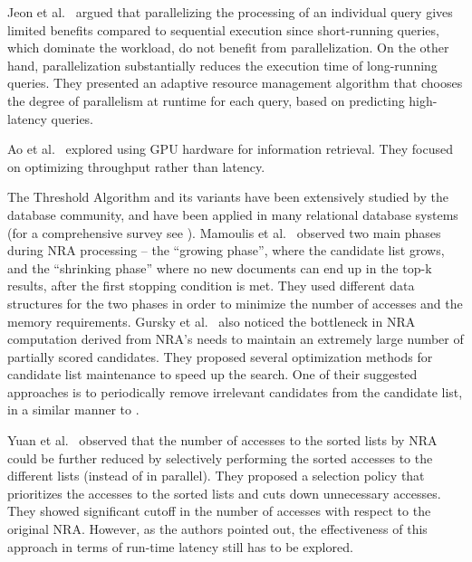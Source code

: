 Jeon et al.~\cite{Jeon:2014} argued that parallelizing the processing of an individual query gives limited benefits compared to sequential execution since short-running queries, which dominate the workload, do not benefit from parallelization. On the other hand, parallelization substantially reduces the execution time of long-running queries.  They presented an adaptive resource management algorithm that chooses the degree of parallelism at runtime for each query, based on predicting high-latency queries.

Ao et al.~\cite{Ao:2011} explored using GPU hardware for information retrieval. They focused on optimizing throughput rather than latency. 

The Threshold Algorithm and its variants \cite{Fagin:2001,Fagin:2003,Akbarinia:2007} have been extensively studied by the database community, and have been applied in many relational database systems (for a comprehensive survey see \cite{ilyas2008survey}). 
Mamoulis et al.~\cite{Mamoulis:2007} observed two main phases during NRA processing -- the ``growing phase'', where the candidate list grows, and the ``shrinking phase'' where no new documents can end up in the top-k results, after the first stopping condition is met. They used different data structures for the two phases in order to minimize the number of accesses and the memory requirements. 
Gursky et al.~\cite{Gursky:2008} also noticed the bottleneck in NRA computation derived from NRA's needs to maintain an extremely large number of partially scored candidates. They proposed several optimization methods for candidate list maintenance to speed up the search. One of their suggested approaches is to periodically remove irrelevant candidates from the candidate list, in a similar manner to \alg{}. 

Yuan et al.~\cite{yuan:2012} observed that the number of accesses to the sorted lists by NRA could be further reduced by selectively performing the sorted accesses to the different lists (instead of in parallel). They proposed a selection policy that prioritizes the accesses to the sorted lists and cuts down unnecessary accesses. They showed significant cutoff in the number of accesses with respect to the original NRA. However, 
as the authors pointed out, the effectiveness of this approach in terms of run-time latency still has to be explored.

